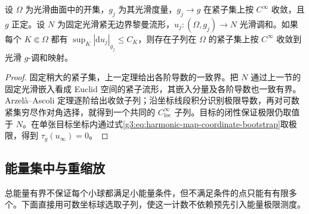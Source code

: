 \begin{corollary}\label{g3:cor:harmonic-map-local-smooth-compactness}
	设 \(\Omega\) 为光滑曲面中的开集，\(g_j\) 为其光滑度量，\(g_j\to g\) 在紧子集上按 \(C^\infty\) 收敛，且 \(g\) 正定。设 \(N\) 为固定光滑紧无边界黎曼流形，\(u_j:(\Omega,g_j)\to N\) 光滑调和。如果每个 \(K\Subset\Omega\) 都有 \(\sup_K|\mathrm du_j|_{g_j}\le C_K\)，则存在子列在 \(\Omega\) 的紧子集上按 \(C^\infty\) 收敛到光滑 \(g\)-调和映射。
\end{corollary}
\begin{proof}
	固定稍大的紧子集，上一定理给出各阶导数的一致界。把 \(N\) 通过上一节的固定光滑嵌入看成 Euclid 空间的紧子流形，其嵌入分量及各阶导数也一致有界。Arzelà--Ascoli 定理逐阶给出收敛子列；沿坐标线段积分识别极限导数，再对可数紧集穷尽作对角选择，就得到一个共同的 \(C^\infty_{\mathrm{loc}}\) 子列。目标的闭性保证极限仍取值于 \(N\)。在单张目标坐标内通过式\eqref{g3:eq:harmonic-map-coordinate-bootstrap}取极限，得到 \(\tau_g(u_\infty)=0\)。
\end{proof}

\subsection{能量集中与重缩放}
\label{g3:subsec:1803:05}
总能量有界不保证每个小球都满足小能量条件，但不满足条件的点只能有有限多个。下面直接用可数坐标球选取子列，使这一计数不依赖预先引入能量极限测度。

